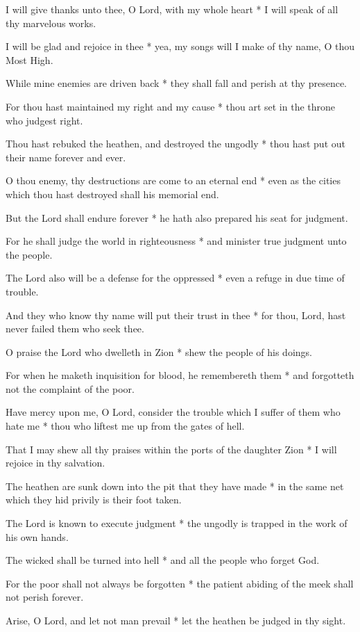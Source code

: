 I will give thanks unto thee, O Lord, with my whole heart * I will speak of all thy marvelous works.

I will be glad and rejoice in thee * yea, my songs will I make of thy name, O thou Most High.

While mine enemies are driven back * they shall fall and perish at thy presence.

For thou hast maintained my right and my cause * thou art set in the throne who judgest right.

Thou hast rebuked the heathen, and destroyed the ungodly * thou hast put out their name forever and ever.

O thou enemy, thy destructions are come to an eternal end * even as the cities which thou hast destroyed shall his memorial end.

But the Lord shall endure forever * he hath also prepared his seat for judgment.

For he shall judge the world in righteousness * and minister true judgment unto the people.

The Lord also will be a defense for the oppressed * even a refuge in due time of trouble.

And they who know thy name will put their trust in thee * for thou, Lord, hast never failed them who seek thee.

O praise the Lord who dwelleth in Zion * shew the people of his doings.

For when he maketh inquisition for blood, he remembereth them * and forgotteth not the complaint of the poor.

Have mercy upon me, O Lord, consider the trouble which I suffer of them who hate me * thou who liftest me up from the gates of hell.

That I may shew all thy praises within the ports of the daughter Zion * I will rejoice in thy salvation.

The heathen are sunk down into the pit that they have made * in the same net which they hid privily is their foot taken.

The Lord is known to execute judgment * the ungodly is trapped in the work of his own hands.

The wicked shall be turned into hell * and all the people who forget God.

For the poor shall not always be forgotten * the patient abiding of the meek shall not perish forever.

Arise, O Lord, and let not man prevail * let the heathen be judged in thy sight.

